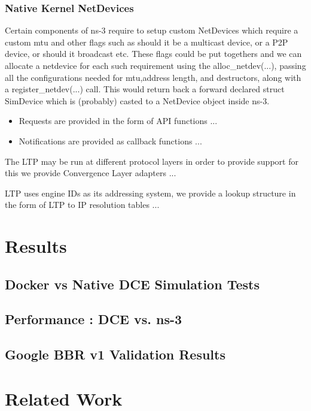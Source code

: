 \documentclass{sig-alternate}
\begin{document}
\subsubsection{Native Kernel NetDevices}
Certain components of ns-3 require to setup custom NetDevices which require a custom mtu and other flags such as should it be a multicast device,
or a P2P device, or should it broadcast etc. These flags could be put togethers and we can allocate a netdevice for each such requirement using
the alloc\_netdev(...), passing all the configurations needed for mtu,address length, and destructors, along with a register\_netdev(...) call.
This would return back a forward declared struct SimDevice which is (probably)  casted to a NetDevice object inside ns-3.


\begin{itemize}
 \item Requests are provided in the form of API functions ...
 \item Notifications are provided as callback functions ...
\end{itemize}

The LTP may be run at different protocol layers in order to provide support for this
we provide Convergence Layer adapters ...

LTP uses engine IDs as its addressing system, we provide a lookup structure in the form of LTP to IP resolution tables ...


\section{Results}

\subsection{Docker vs Native DCE Simulation Tests}

\subsection{Performance : DCE vs. ns-3}

\subsection{Google BBR v1 Validation Results}

\section{Related Work}
\end{document}
